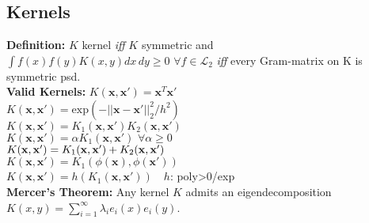\subsection*{Kernels}
\textbf{Definition:} $K$ kernel \emph{iff} $K$ symmetric and $\int f(x)f(y)K(x,y)dx\,dy \geq 0\,\,\forall f\in\mathcal{L}_2$ \emph{iff} every Gram-matrix on K is symmetric psd.\\
\textbf{Valid Kernels:}
$K(\mathbf{x},\mathbf{x'}){=}\mathbf{x}^T\mathbf{x'}$\\
$K(\mathbf{x},\mathbf{x'}){=}\mathrm{exp}(-||\mathbf{x}{-}\mathbf{x'}||_2^2/h^2)$\\
$K(\mathbf{x}, \mathbf{x'})=K_1(\mathbf{x}, \mathbf{x'})K_2(\mathbf{x}, \mathbf{x'})$\\
$K(\mathbf{x},\mathbf{x'})=\alpha K_1(\mathbf{x}, \mathbf{x'})\,\,\forall \alpha\geq0$\\
$K({\mathbf{x}}, {\mathbf{x}}') = K_1({\mathbf{x}}, {\mathbf{x}}') + K_2({\mathbf{x}}, {\mathbf{x}}')$\\
$K(\mathbf{x},\mathbf{x'}){=}K_1(\phi(\mathbf{x}), \phi(\mathbf{x'}))\quad$\\
$K(\mathbf{x},\mathbf{x'}){=}h(K_1(\mathbf{x}, \mathbf{x'}))\quad h$: poly>0/exp\\
\textbf{Mercer's Theorem:} Any kernel $K$ admits an eigendecomposition $K(x,y) = \sum_{i=1}^\infty \lambda_i e_i(x)e_i(y)$.